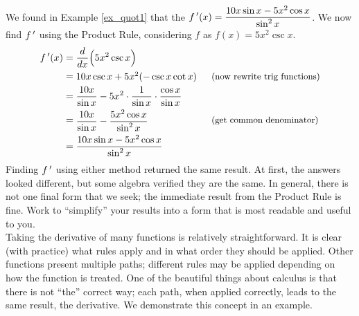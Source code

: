{We found in Example \ref{ex_quot1} that the $\displaystyle f\,'(x) = \frac{10x\sin x - 5x^2\cos x}{\sin^2 x}$. We now find $f\,'$ using the Product Rule, considering $f$ as $f(x) = 5x^2\csc x$.
		\begin{align*}
		\fp(x) &= \frac{d}{dx}\Big(5x^2\csc x\Big) \\
					&=	\parbox{140pt}{$10x\csc x + 5x^2(-\csc x\cot x)$} \text{\small (now rewrite trig functions)}\\
					&= \frac{10x}{\sin x} - 5x^2\cdot \frac{1}{\sin x}\cdot \frac{\cos x}{\sin x}\\
					&=	\parbox{140pt}{$\ds \frac{10x}{\sin x} - \ds\frac{5x^2\cos x}{\sin ^2x}$} \text{\small (get common denominator)}\\
					&= \frac{10x\sin x - 5x^2\cos x}{\sin^2x}
		\end{align*}
Finding $f\,'$ using either method returned the same result. At first, the answers looked different, but some algebra verified they are the same. In general, there is not one final form that we seek; the immediate result from the Product Rule is fine. Work to ``simplify\primeskip'' your results into a form that is most readable and useful to you.
}\\

Taking the derivative of many functions is relatively straightforward. It is clear (with practice) what rules apply and in what order they should be applied. Other functions present multiple paths; different rules may be applied depending on how the function is treated. One of the beautiful things about calculus is that there is not ``the'' correct way; each path, when applied correctly, leads to the same result, the derivative. We demonstrate this concept in an example.\\

